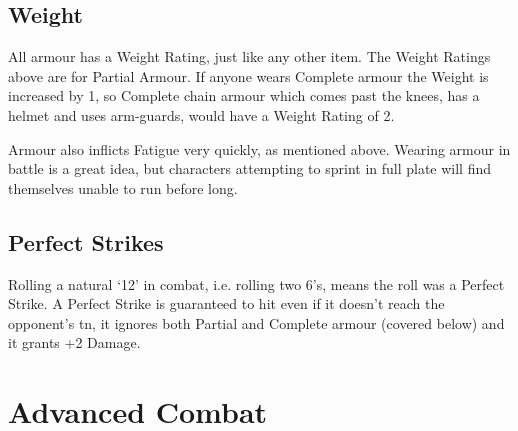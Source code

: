 \documentclass[titlepage,a4paper,openany]{book}
\begin{document}
\begin{multicols}{2}
\subsection{Weight}

All armour has a Weight Rating, just like any other item. The Weight Ratings above are for Partial Armour. If anyone wears Complete armour the Weight is increased by 1, so Complete chain armour which comes past the knees, has a helmet and uses arm-guards, would have a Weight Rating of 2.

Armour also inflicts Fatigue very quickly, as mentioned above. Wearing armour in battle is a great idea, but characters attempting to sprint in full plate will find themselves unable to run before long.

\subsection{Perfect Strikes}

Rolling a \gls{natural} `12' in combat, i.e. rolling two 6's, means the roll was a Perfect Strike. A Perfect Strike is guaranteed to hit even if it doesn't reach the opponent's \gls{tn}, it ignores both Partial and Complete armour (covered below) and it grants +2 Damage.

\end{multicols}

\section{Advanced Combat}
\end{document}
